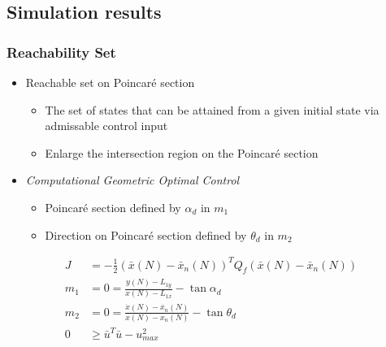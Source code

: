 \documentclass[11pt,professionalfonts]{beamer}
\begin{document}
\subsection{Simulation results}
\begin{frame} %
\frametitle{Reachability Set}
  \begin{itemize}
  \item Reachable set on Poincar\'e section
  		\begin{itemize}
  			\item The set of states that can be attained from a given initial state via admissable control input
  			\item Enlarge the intersection region on the Poincar\'e section
  		\end{itemize}
  \item \emph{Computational Geometric Optimal Control}
	\begin{itemize}
  		\item Poincar\'e section defined by \( \alpha_d \) in \( m_1\)
		\item Direction on Poincar\'e section defined by \( \theta_d \) in \( m_2 \)
	\end{itemize}
 \end{itemize}
  \begin{align*}
	J &= -\frac{1}{2} \left( \bar{x}(N) - \bar{x}_{n}(N)\right)^T Q_f\left( \bar{x}(N) - \bar{x}_{n}(N)\right)\\
	m_1 &= 0 = \frac{y(N) - L_{1y}}{x(N) - L_{1x}} - \tan{\alpha_d} \\ 
    m_2&= 0 = \frac{\dot{x}(N) - \dot{x_n}(N) }{x(N) -x_n(N) } - \tan{\theta_d} \\
	 0 &\geq\bar{u}^T \bar{u} - u_{max}^2 
	\end{align*}

\end{frame}   %
\end{document}
